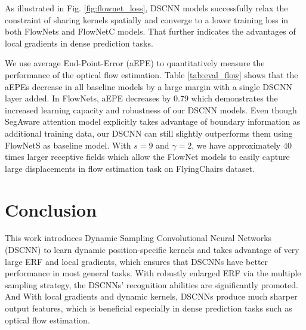 \documentclass[runningheads]{llncs}
\begin{document}
As illustrated in Fig. \ref{fig:flownet_loss}, DSCNN models successfully relax the constraint of sharing kernels spatially and converge to a lower training loss in both FlowNets and FlowNetC models. That further indicates the advantages of local gradients in dense prediction tasks.

We use average End-Point-Error (aEPE) to quantitatively measure the performance of the optical flow estimation. Table \ref{tab:eval_flow} shows that the aEPEs decrease in all baseline models by a large margin with a single DSCNN layer added. 
In FlowNets, aEPE decreases by 0.79 which demonstrates the increased learning capacity and robustness of our DSCNN models. 
Even though SegAware attention model \cite{harley2017segmentation} explicitly takes advantage of boundary information as additional training data, our DSCNN can still slightly outperforms them using FlowNetS as baseline model. With $s=9$ and $\gamma=2$, we have approximately $40$ times larger receptive fields which allow the FlowNet models to easily capture large displacements in flow estimation task on FlyingChairs dataset.  

\section{Conclusion}
This work introduces Dynamic Sampling Convolutional Neural Networks (DSCNN) to learn dynamic position-specific kernels and takes advantage of very large ERF and local gradients, which ensures that DSCNNs have better performance in most general tasks. With robustly enlarged ERF via the multiple sampling strategy, the DSCNNs' recognition abilities are significantly promoted. And With local gradients and dynamic kernels, DSCNNs produce much sharper output features, which is beneficial especially in dense prediction tasks such as optical flow estimation. 





\end{document}
